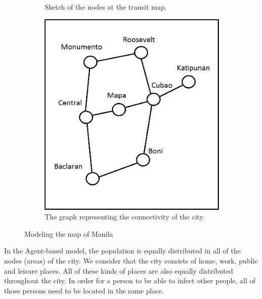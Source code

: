 \documentclass[a4paper]{article}
\begin{document}
\begin{figure}[H]
\begin{subfigure}[b]{0.3\textwidth}
\caption{Sketch of the nodes at the transit map.}
\label{fig:sketch map}
\end{subfigure} \quad
\begin{subfigure}[b]{0.3\textwidth}
\includegraphics[width=\textwidth]{Manila-model_2}
\caption{The graph representing the connectivity of the city.}
\label{fig:map model}
\end{subfigure}
\caption{Modeling the map of Manila}
\label{fig:Manila}
\end{figure}

In the Agent-based model, the population is equally distributed in all of the nodes (areas) of the city. We consider that the city consists of home, work, public and leisure places. All of these kinds of places are also equally distributed throughout the city. In order for a person to be able to infect other people, all of those persons need to be located in the same place.%
\end{document}
